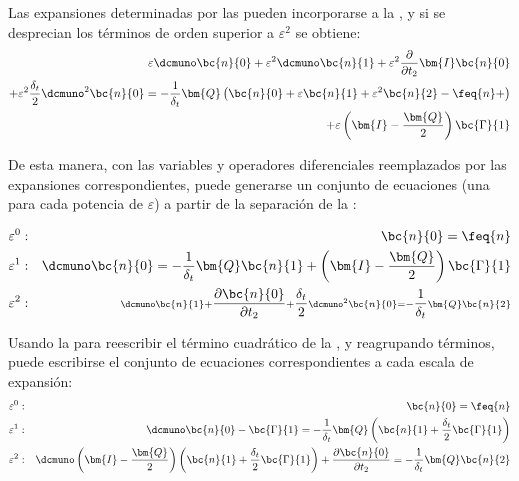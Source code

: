 Las expansiones determinadas por las  pueden incorporarse a la , y si se desprecian los t\'erminos de orden superior a $\varepsilon^2$ se obtiene:
\begin{equation}
	\begin{aligned}
		\varepsilon \dcmuno \bc{n}{0} + \varepsilon^2 \dcmuno \bc{n}{1} + \varepsilon^2 \dfrac{\partial}{\partial t_2} \bm{I} \bc{n}{0} \\
		+ \varepsilon^2 \dfrac{\delta_t}{2} \dcmuno^2 \bc{n}{0} = -\dfrac{1}{\delta_t} \bm{Q} \left( \bc{n}{0} + \varepsilon \bc{n}{1} + \varepsilon^2 \bc{n}{2} - \feq{n} +  \right) \\
		+ \varepsilon \left( \bm{I}-\dfrac{\bm{Q}}{2}\right) \bc{\Gamma}{1}
	\end{aligned}
	\label{eq:modelo_2d_escalas}
\end{equation}

De esta manera, con las variables y operadores diferenciales reemplazados por las expansiones correspondientes, puede generarse un conjunto de ecuaciones (una para cada potencia de $\varepsilon$) a partir de la separaci\'on de la :

\begin{subequations}
	\begin{align}
		\varepsilon^0: && \bc{n}{0} = \feq{n}\\
		\varepsilon^1: && \dcmuno \bc{n}{0} = -\dfrac{1}{\delta_t} \bm{Q} \bc{n}{1} + \left( \bm{I}-\dfrac{\bm{Q}}{2}\right) \bc{\Gamma}{1} \label{eq:eps_1_0}\\	
		\varepsilon^2: && {\scriptstyle \dcmuno \bc{n}{1} + \dfrac{\partial \bc{n}{0}}{\partial t_2}  + \dfrac{\delta_t}{2} \dcmuno^2 \bc{n}{0}  = -\dfrac{1}{\delta_t} \bm{Q} \bc{n}{2}} \label{eq:eps_2_0}
	\end{align}
\end{subequations}


Usando la  para reescribir el t\'ermino cuadr\'atico de la , y reagrupando t\'erminos, puede escribirse el conjunto de ecuaciones correspondientes a cada escala de expansi\'on:
\begin{subequations}
	\begin{align}
		\varepsilon^0: && \bc{n}{0} = \feq{n} \label{eq:eps_0}\\
		\varepsilon^1: && \dcmuno \bc{n}{0} - \bc{\Gamma}{1} = -\dfrac{1}{\delta_t} \bm{Q} \left( \bc{n}{1} + \dfrac{\delta_t}{2} \bc{\Gamma}{1} \right)  \label{eq:eps_1}\\
		\varepsilon^2: && \dcmuno \left( \bm{I}-\dfrac{\bm{Q}}{2}\right) \left( \bc{n}{1} + \dfrac{\delta_t}{2} \bc{\Gamma}{1} \right) + \dfrac{\partial \bc{n}{0}}{\partial t_2}  =  -\dfrac{1}{\delta_t} \bm{Q} \bc{n}{2} \label{eq:eps_2}
	\end{align}
\end{subequations}

